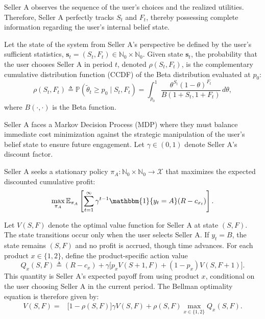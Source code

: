 \documentclass[opre]{informs3} %
\newcommand{\Ind}[1]{\mathbbm{1}\{#1\}}
\begin{document}
Seller A observes the sequence of the user's choices and the realized utilities. Therefore, Seller A perfectly tracks $S_t$ and $F_t$, thereby possessing complete information regarding the user's internal belief state.

Let the state of the system from Seller A's perspective be defined by the user's sufficient statistics, $\bm{s}_t = (S_t, F_t) \in \mathbb{N}_0 \times \mathbb{N}_0$. Given state $\bm{s}_t$, the probability that the user chooses Seller A in period $t$, denoted $\rho(S_t, F_t)$, is the complementary cumulative distribution function (CCDF) of the Beta distribution evaluated at $p_0$:
\begin{equation}
    \rho(S_t, F_t) \triangleq \mathbb{P}(\tilde{\theta}_t \geq p_0 \mid S_t, F_t) = \int_{p_0}^{1} \frac{\theta^{S_t} (1-\theta)^{F_t}}{B(1+S_t, 1+F_t)} \, d\theta,
\end{equation}
where $B(\cdot, \cdot)$ is the Beta function.

Seller A faces a Markov Decision Process (MDP) where they must balance immediate cost minimization against the strategic manipulation of the user's belief state to ensure future engagement. Let $\gamma \in (0, 1)$ denote Seller A's discount factor. 

\begin{problem}
Seller A seeks a stationary policy $\pi_A : \mathbb{N}_0 \times \mathbb{N}_0 \to \mathcal{X}$ that maximizes the expected discounted cumulative profit:
\begin{equation}
    \max_{\pi_A} \mathbb{E}_{\pi_A} \left[ \sum_{t=1}^{\infty} \gamma^{t-1} \Ind{y_t = A} (R - c_{x_t}) \right].
\end{equation}
\end{problem}

Let $V(S, F)$ denote the optimal value function for Seller A at state $(S, F)$. The state transitions occur only when the user selects Seller A. If $y_t = B$, the state remains $(S, F)$ and no profit is accrued, though time advances. For each product $x \in \{1,2\}$, define the product-specific action value
\begin{equation}
    Q_x(S,F)
    \triangleq
    (R-c_x)
    + \gamma \big[ p_x V(S+1,F) + (1-p_x)V(S,F+1) \big].
\end{equation}
This quantity is Seller A's expected payoff from using product $x$, conditional on the user choosing Seller A in the current period. The Bellman optimality equation is therefore given by:
\begin{equation}
\begin{aligned}
    V(S, F) =& \big[1 - \rho(S, F)\big] \gamma V(S, F) + \rho(S, F) \max_{x \in \{1, 2\}} Q_x(S,F).
\end{aligned}
\end{equation}
\end{document}
